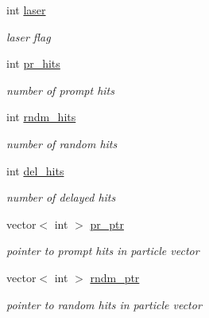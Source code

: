 \begin{DoxyCompactItemize}
\mbox{\label{classmbevts_a78d94e595251e90308518a62ebfde561}} 
int \hyperlink{classmbevts_a78d94e595251e90308518a62ebfde561}{laser}
\begin{DoxyCompactList}\small\item\em laser flag \end{DoxyCompactList}\item 
\mbox{\label{classmbevts_a03061f3cb086b605ddebf77737fe5eb0}} 
int \hyperlink{classmbevts_a03061f3cb086b605ddebf77737fe5eb0}{pr\+\_\+hits}
\begin{DoxyCompactList}\small\item\em number of prompt hits \end{DoxyCompactList}\item 
\mbox{\label{classmbevts_a33b7c77a5fe645bfdcb8dc581769e3b7}} 
int \hyperlink{classmbevts_a33b7c77a5fe645bfdcb8dc581769e3b7}{rndm\+\_\+hits}
\begin{DoxyCompactList}\small\item\em number of random hits \end{DoxyCompactList}\item 
\mbox{\label{classmbevts_a0780adbd09772dced2042b7067ace74e}} 
int \hyperlink{classmbevts_a0780adbd09772dced2042b7067ace74e}{del\+\_\+hits}
\begin{DoxyCompactList}\small\item\em number of delayed hits \end{DoxyCompactList}\item 
\mbox{\label{classmbevts_ae0c8c3d4303a43f843cd3eda12cfb9e5}} 
vector$<$ int $>$ \hyperlink{classmbevts_ae0c8c3d4303a43f843cd3eda12cfb9e5}{pr\+\_\+ptr}
\begin{DoxyCompactList}\small\item\em pointer to prompt hits in particle vector \end{DoxyCompactList}\item 
\mbox{\label{classmbevts_aea8371f283b731fdba6e3af0e9a74852}} 
vector$<$ int $>$ \hyperlink{classmbevts_aea8371f283b731fdba6e3af0e9a74852}{rndm\+\_\+ptr}
\begin{DoxyCompactList}\small\item\em pointer to random hits in particle vector \end{DoxyCompactList}\item 

\end{DoxyCompactItemize}
